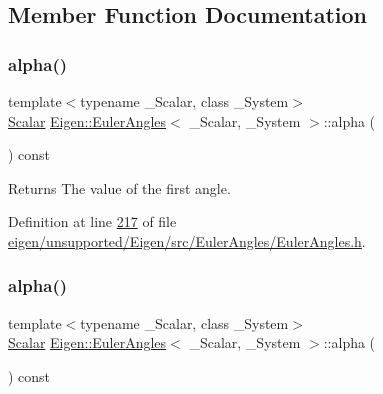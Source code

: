 \subsection{Member Function Documentation}
\mbox{\label{class_eigen_1_1_euler_angles_a6146f78ee0fb9d9a7d685a4654066825}} 
\subsubsection{\texorpdfstring{alpha()}{alpha()}\hspace{0.1cm}{\footnotesize\ttfamily [1/4]}}
{\footnotesize\ttfamily template$<$typename \+\_\+\+Scalar, class \+\_\+\+System$>$ \\
\hyperlink{class_eigen_1_1_euler_angles_a2ab1d433ac9683268446f8905ac31aac}{Scalar} \hyperlink{class_eigen_1_1_euler_angles}{Eigen\+::\+Euler\+Angles}$<$ \+\_\+\+Scalar, \+\_\+\+System $>$\+::alpha (\begin{DoxyParamCaption}{ }\end{DoxyParamCaption}) const\hspace{0.3cm}{\ttfamily [inline]}}

\begin{DoxyReturn}{Returns}
The value of the first angle. 
\end{DoxyReturn}


Definition at line \hyperlink{eigen_2unsupported_2_eigen_2src_2_euler_angles_2_euler_angles_8h_source_l00217}{217} of file \hyperlink{eigen_2unsupported_2_eigen_2src_2_euler_angles_2_euler_angles_8h_source}{eigen/unsupported/\+Eigen/src/\+Euler\+Angles/\+Euler\+Angles.\+h}.

\mbox{\label{class_eigen_1_1_euler_angles_a6146f78ee0fb9d9a7d685a4654066825}} 
\subsubsection{\texorpdfstring{alpha()}{alpha()}\hspace{0.1cm}{\footnotesize\ttfamily [2/4]}}
{\footnotesize\ttfamily template$<$typename \+\_\+\+Scalar, class \+\_\+\+System$>$ \\
\hyperlink{class_eigen_1_1_euler_angles_a2ab1d433ac9683268446f8905ac31aac}{Scalar} \hyperlink{class_eigen_1_1_euler_angles}{Eigen\+::\+Euler\+Angles}$<$ \+\_\+\+Scalar, \+\_\+\+System $>$\+::alpha (\begin{DoxyParamCaption}{ }\end{DoxyParamCaption}) const\hspace{0.3cm}{\ttfamily [inline]}}

